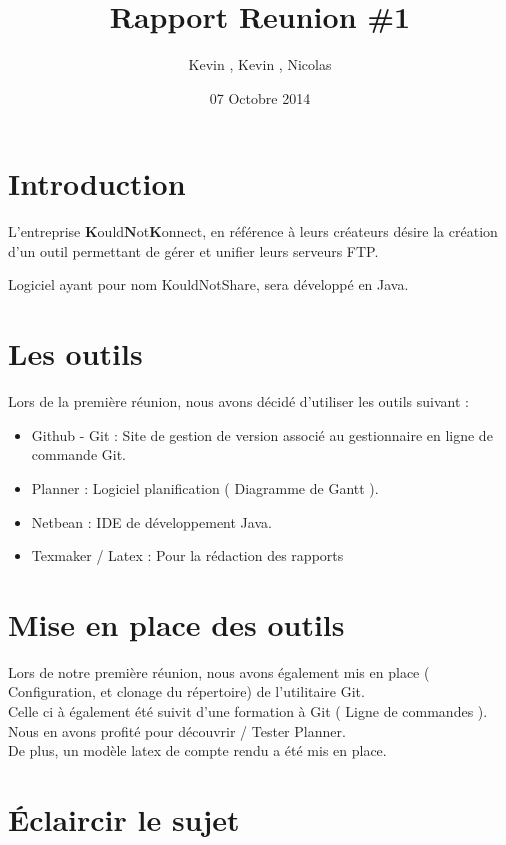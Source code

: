 \documentclass{article}
\title{Rapport Reunion \#1}
\author{Kevin \bsc{Bascol}, Kevin \bsc{Laoussing}, Nicolas \bsc{Reynaud}}
\date{07 Octobre 2014}
\begin{document}
\maketitle
\newpage

\renewcommand{\contentsname}{Sommaire}
\tableofcontents
\newpage


\section{Introduction}

L'entreprise $\textbf{K}$ould$\textbf{N}$ot$\textbf{K}$onnect, en référence à leurs créateurs désire la création d'un outil permettant de gérer et unifier leurs serveurs FTP.

Logiciel ayant pour nom KouldNotShare, sera développé en Java.

\section{Les outils}

Lors de la première réunion, nous avons décidé d'utiliser les outils suivant : 
\begin{itemize}
	\item Github - Git : Site de gestion de version associé au gestionnaire en ligne de commande Git.
	\item Planner : Logiciel planification ( Diagramme de Gantt ).
	\item Netbean : IDE de développement Java.
	\item Texmaker / Latex : Pour la rédaction des rapports
\end{itemize}

\section{Mise en place des outils}

Lors de notre première réunion, nous avons également mis en place ( Configuration, et clonage du répertoire) de l'utilitaire Git. \\
Celle ci à également été suivit d'une formation à Git ( Ligne de commandes ). \\

Nous en avons profité pour découvrir / Tester Planner. \\
De plus, un modèle latex de compte rendu a été mis en place. \\

\section{Éclaircir le sujet}
\end{document}
